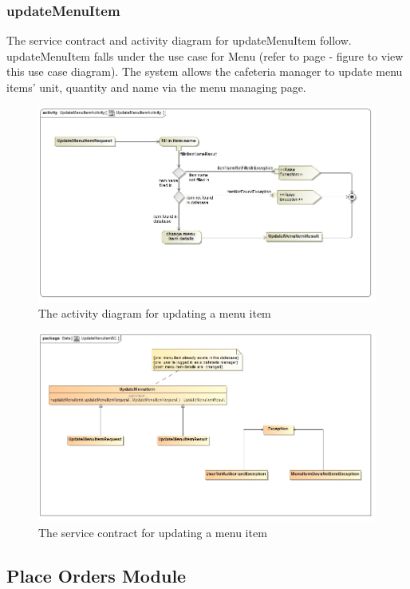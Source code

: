 \documentclass[a4paper,12pt]{report}
\begin{document}
 \subsubsection{updateMenuItem}
The service contract and activity diagram for updateMenuItem follow. updateMenuItem falls under the use case for Menu (refer to page   - figure   to view this use case diagram). The system allows the cafeteria manager to update menu items' unit, quantity and name via the menu managing page.
\begin{figure}[H]
  \centering
    \includegraphics[width=1.0\textwidth]{../images/UpdateMenuItemActivity.jpg}
    \caption{The activity diagram for updating a menu item } 
\end{figure}
\begin{figure}[H]
	\centering
	\includegraphics[width=1.0\textwidth]{../images/UpdateMenuItemSC.jpg}
	\caption{The service contract for updating a menu item}
\end{figure}

\subsection{Place Orders Module}
\end{document}
